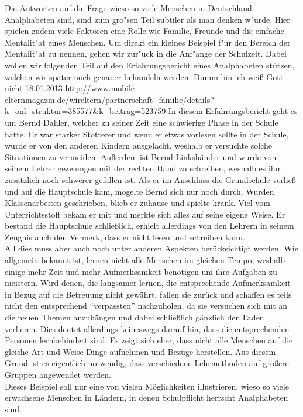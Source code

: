 Die Antworten auf die Frage wieso so viele Menschen in Deutschland Analphabeten sind, sind zum gro"sen Teil subtiler als man denken w"urde. Hier spielen zudem viele Faktoren eine Rolle wie Familie, Freunde und die einfache Mentalit"at eines Menschen. Um direkt ein kleines Beispiel f"ur den Bereich der Mentalit"at zu nennen, gehen wir zur"uck in die Anf"ange der Schulzeit. Dabei wollen wir folgenden Teil auf den Erfahrungsbericht eines Analphabeten stützen, welchen wir später noch genauer behandeln werden.
				{Dumm bin ich weiß Gott nicht}
				{18.01.2013 }
				{http://www.mobile-elternmagazin.de/wireltern/partnerschaft_familie/details?k_onl_struktur=385577&k_beitrag=523759}
In diesem Erfahrungsbericht geht es um Bernd Dahler, welcher zu seiner Zeit eine schwierige Phase in der Schule hatte. Er war starker Stotterer und wenn er etwas vorlesen sollte in der Schule, wurde er von den anderen Kindern ausgelacht, weshalb er versuchte solche Situationen zu vermeiden. Außerdem ist Bernd Linkshänder und wurde von seinem Lehrer gezwungen mit der rechten Hand zu schreiben, weshalb es ihm zusätzlich noch schwerer gefallen ist. Als er im Anschluss die Grundschule verließ und auf die Hauptschule kam, mogelte Bernd sich nur noch durch. Wurden Klassenarbeiten geschrieben, blieb er zuhause und spielte krank. Viel vom Unterrichtsstoff bekam er mit und merkte sich alles auf seine eigene Weise. Er bestand die Hauptschule schließlich, erhielt allerdings von den Lehrern in seinem Zeugnis auch den Vermerk, dass er nicht lesen und schreiben kann.\\
All dies muss aber auch noch unter anderen Aspekten berücksichtigt werden.
Wie allgemein bekannt ist, lernen nicht alle Menschen im gleichen Tempo, weshalb einige mehr Zeit und mehr Aufmerksamkeit benötigen um ihre Aufgaben zu meistern. Wird denen, die langsamer lernen, die entsprechende Aufmerksamkeit in Bezug auf die Betreuung nicht gewährt, fallen sie zurück und schaffen es teils nicht den entsprechend "`verpassten"' nachzuholen, da sie versuchen sich mit an die neuen Themen anzuhängen und dabei schließlich gänzlich den Faden verlieren. Dies deutet allerdings keineswegs darauf hin, dass die entsprechenden Personen lernbehindert sind. Es zeigt sich eher, dass nicht alle Menschen auf die gleiche Art und Weise Dinge aufnehmen und Bezüge herstellen. Aus diesem Grund ist es eigentlich notwendig, dass verschiedene Lehrmethoden auf größere Gruppen angewendet werden.\\

Dieses Beispiel soll nur eine von vielen Möglichkeiten illustrieren, wieso so viele erwachsene Menschen in Ländern, in denen Schulpflicht herrscht Analphabeten sind. \\

